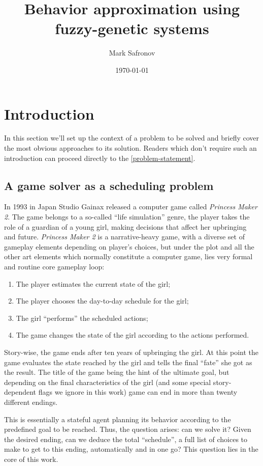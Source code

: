 \documentclass[11pt, a4paper]{article}
\title{Behavior approximation using fuzzy-genetic systems}
\author{Mark Safronov}
\date{\today}
\begin{document}
	
	
	
	\tableofcontents
	
	\section{Introduction}
	
	In this section we'll set up the context of a problem to be solved and briefly cover the most obvious approaches to its solution.
	Readers which don't require such an introduction can proceed directly to the \ref{problem-statement}.
	
	\subsection{A game solver as a scheduling problem}

	In 1993 in Japan Studio Gainax released a computer game called \textit{Princess Maker 2}.
	The game belongs to a so-called ``life simulation'' genre, the player takes the role of a guardian of a young girl, making decisions that affect her upbringing and future.
	\textit{Princess Maker 2} is a narrative-heavy game, with a diverse set of gameplay elements depending on player's choices, but under the plot and all the other art elements which normally constitute a computer game, lies very formal and routine core gameplay loop:
	
	\begin{enumerate}
		\item The player estimates the current state of the girl;
		\item The player chooses the day-to-day schedule for the girl;
		\item The girl ``performs'' the scheduled actions;
		\item The game changes the state of the girl according to the actions performed.
	\end{enumerate}
	
	Story-wise, the game ends after ten years of upbringing the girl.
	At this point the game evaluates the state reached by the girl and tells the final ``fate'' she got as the result.
	The title of the game being the hint of the ultimate goal, but depending on the final characteristics of the girl (and some special story-dependent flags we ignore in this work) game can end in more than twenty different endings.
		
	This is essentially a stateful agent planning its behavior according to the predefined goal to be reached.
	Thus, the question arises: can we solve it? Given the desired ending, can we deduce the total ``schedule'', a full list of choices to make to get to this ending, automatically and in one go? This question lies in the core of this work.
\end{document}
